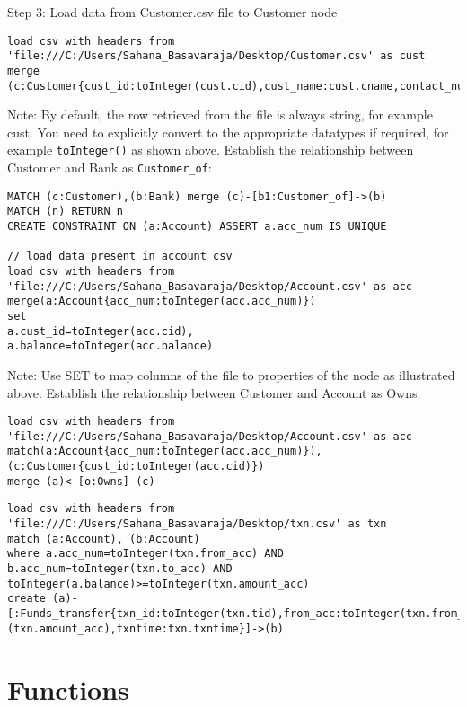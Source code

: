 \documentclass[../main.tex]{subfiles}
\begin{document}
Step 3:
Load data from Customer.csv file to Customer node
\begin{lstlisting}[language=cypher]
load csv with headers from 'file:///C:/Users/Sahana_Basavaraja/Desktop/Customer.csv' as cust
merge (c:Customer{cust_id:toInteger(cust.cid),cust_name:cust.cname,contact_num:toInteger(cust.phnum)})
\end{lstlisting}
Note: By default, the row retrieved from the file is always string, for example cust. You need to explicitly convert to the appropriate datatypes if required, for example \lstinline{toInteger()} as shown above.
Establish the relationship between Customer and Bank as \lstinline{Customer_of}:
\begin{lstlisting}[language=cypher]
MATCH (c:Customer),(b:Bank) merge (c)-[b1:Customer_of]->(b)
MATCH (n) RETURN n
CREATE CONSTRAINT ON (a:Account) ASSERT a.acc_num IS UNIQUE

// load data present in account csv
load csv with headers from 'file:///C:/Users/Sahana_Basavaraja/Desktop/Account.csv' as acc
merge(a:Account{acc_num:toInteger(acc.acc_num)})
set 
a.cust_id=toInteger(acc.cid),
a.balance=toInteger(acc.balance)

\end{lstlisting}
Note: Use SET to map columns of the file to properties of the node as illustrated above.
Establish the relationship between Customer and Account as Owns:

\begin{lstlisting}[language=cypher]
load csv with headers from 'file:///C:/Users/Sahana_Basavaraja/Desktop/Account.csv' as acc
match(a:Account{acc_num:toInteger(acc.acc_num)}),(c:Customer{cust_id:toInteger(acc.cid)})
merge (a)<-[o:Owns]-(c)

\end{lstlisting}

\begin{lstlisting}[language=cypher]
load csv with headers from 'file:///C:/Users/Sahana_Basavaraja/Desktop/txn.csv' as txn
match (a:Account), (b:Account)
where a.acc_num=toInteger(txn.from_acc) AND b.acc_num=toInteger(txn.to_acc) AND toInteger(a.balance)>=toInteger(txn.amount_acc)
create (a)-[:Funds_transfer{txn_id:toInteger(txn.tid),from_acc:toInteger(txn.from_acc),to_acc:toInteger(txn.to_acc),amount:toInteger
(txn.amount_acc),txntime:txn.txntime}]->(b)
\end{lstlisting}

\section{Functions}
\end{document}
